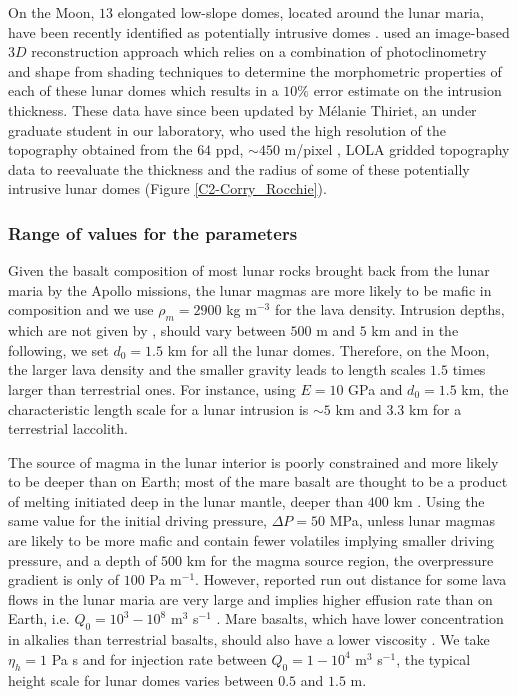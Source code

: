 On the Moon, $13$ elongated  low-slope domes, located around the lunar
maria, have  been recently  identified as potentially  intrusive domes
\citep{Wohler:2007it,Wohler:2009jj}.   \citet{Wohler:2009jj}  used  an
image-based $3D$ reconstruction approach which relies on a combination
of photoclinometry and shape from  shading techniques to determine the
morphometric properties of each of  these lunar domes which results in
a $10\%$  error estimate on  the intrusion thickness. These  data have
since been  updated by Mélanie  Thiriet, an under graduate  student in
our  laboratory,  who  used  the high  resolution  of  the  topography
obtained from  the $64$ ppd, $\sim  450$ m/pixel \citep{Zuber:2009bq},
LOLA  gridded topography  data  to reevaluate  the  thickness and  the
radius  of some  of these  potentially intrusive  lunar domes  (Figure
\ref{C2-Corry_Rocchie}).

\subsubsection*{Range of values for the parameters}

Given the basalt composition of most lunar rocks brought back from the
lunar maria by  the Apollo missions, the lunar magmas  are more likely
to be mafic in composition and we  use $\rho_m = 2900$ kg m$^{-3}$ for
the  lava  density.    Intrusion  depths,  which  are   not  given  by
\citet{Wohler:2009jj}, should vary  between $500$ m and $5$  km and in
the following, we set $d_0=1.5$ km for all the lunar domes. Therefore,
on the Moon, the larger lava  density and the smaller gravity leads to
length scales $1.5$ times larger  than terrestrial ones.  For instance,
using $E=10$ GPa  and $d_0 = 1.5$ km, the  characteristic length scale
for a lunar  intrusion is $\sim 5$  km and $3.3$ km  for a terrestrial
laccolith.

The source  of magma in the  lunar interior is poorly  constrained and
more likely to  be deeper than on  Earth; most of the  mare basalt are
thought to be a product of melting initiated deep in the lunar mantle,
deeper than $400$ km \citep{Shearer:2006gg}.  Using the same value for
the initial driving pressure, $\Delta P = 50$ MPa, unless lunar magmas
are  likely to  be  more  mafic and  contain  fewer volatiles  implying
smaller driving pressure, and a depth of $500$ km for the magma source
region,  the  overpressure gradient  is  only  of $100$  Pa  m$^{-1}$.
However, reported  run out distance for  some lava flows in  the lunar
maria are very  large and implies higher effusion rate  than on Earth,
i.e.             $Q_0=10^3-10^8$             m$^3$            s$^{-1}$
\citep{Crisp:1990gf,Zimbelman:1998ww}.  Mare basalts, which have lower
concentration in alkalies than terrestrial basalts, should also have a
lower viscosity \citep{Zimbelman:1998ww}.  We take $\eta_h=1$ Pa s and
for injection rate between  $Q_0=1-10^4$ m$^{3}$ s$^{-1}$, the typical
height scale for lunar domes varies between $0.5$ and $1.5$ m.

